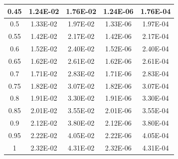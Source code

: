 \documentclass[11pt, a4paper, twocolumn]{article}
\begin{document}
\begin{longtable}[c]{|
>{\columncolor[HTML]{EFEFEF}}c |c|c|c|c|}
0.45               & 1.24E-02                               & 1.76E-02                                & 1.24E-06                               & 1.76E-04                                \\ \hline
0.5                & 1.33E-02                               & 1.97E-02                                & 1.33E-06                               & 1.97E-04                                \\ \hline
0.55               & 1.42E-02                               & 2.17E-02                                & 1.42E-06                               & 2.17E-04                                \\ \hline
0.6                & 1.52E-02                               & 2.40E-02                                & 1.52E-06                               & 2.40E-04                                \\ \hline
0.65               & 1.62E-02                               & 2.61E-02                                & 1.62E-06                               & 2.61E-04                                \\ \hline
0.7                & 1.71E-02                               & 2.83E-02                                & 1.71E-06                               & 2.83E-04                                \\ \hline
0.75               & 1.82E-02                               & 3.07E-02                                & 1.82E-06                               & 3.07E-04                                \\ \hline
0.8                & 1.91E-02                               & 3.30E-02                                & 1.91E-06                               & 3.30E-04                                \\ \hline
0.85               & 2.01E-02                               & 3.55E-02                                & 2.01E-06                               & 3.55E-04                                \\ \hline
0.9                & 2.12E-02                               & 3.80E-02                                & 2.12E-06                               & 3.80E-04                                \\ \hline
0.95               & 2.22E-02                               & 4.05E-02                                & 2.22E-06                               & 4.05E-04                                \\ \hline
1                  & 2.32E-02                               & 4.31E-02                                & 2.32E-06                               & 4.31E-04                                \\ \hline

\end{longtable}
\end{document}
